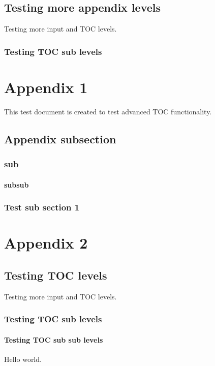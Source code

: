 \documentclass{book}
\begin{document}
\section{Testing more appendix levels}
Testing more input and TOC levels.

\subsection{Testing TOC sub levels}

\appendix

\chapter{Appendix 1}
This test document is created to test advanced TOC functionality.

\section{Appendix subsection}

\subsection{sub}

\subsubsection{subsub}

\subsection{Test sub section 1}

\chapter{Appendix 2}

\section{Testing TOC levels}
Testing more input and TOC levels.

\subsection{Testing TOC sub levels}

\subsubsection{Testing TOC sub sub levels}
Hello world.
\end{document}
